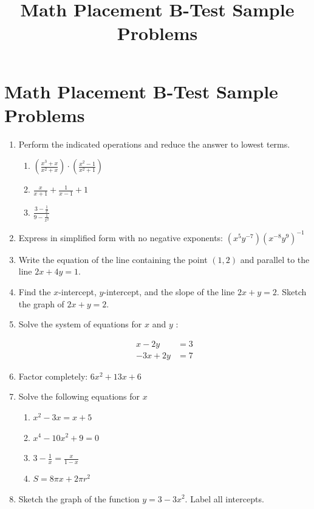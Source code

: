 \documentclass{ximera}
\title{Math Placement B-Test Sample Problems}
\begin{document}
\section*{Math Placement B-Test Sample Problems}

\begin{enumerate}
\item Perform the indicated operations and reduce the answer to lowest terms.

\begin{enumerate}
\item $\left(\frac{x^{3}+x}{x^{2}+x}\right) \cdot\left(\frac{x^{2}-1}{x^{2}+1}\right)$
\item $\frac{x}{x+1}+\frac{1}{x-1}+1$
\item $\frac{3-\frac{1}{x}}{9-\frac{1}{x^{2}}}$
\end{enumerate}

\item Express in simplified form with no negative exponents: $\left(x^{5} y^{-7}\right)\left(x^{-8} y^{9}\right)^{-1}$

\item Write the equation of the line containing the point $(1,2)$ and parallel to the line $2 x+4 y=1$.

\item Find the $x$-intercept, $y$-intercept, and the slope of the line $2 x+y=2$. Sketch the graph of $2 x+y=2$.

\item Solve the system of equations for $x$ and $y$ :

$$\begin{aligned}
x-2 y & =3 \\
-3 x+2 y & =7
\end{aligned}$$

\item Factor completely: $6 x^{2}+13 x+6$

\item Solve the following equations for $x$ 

\begin{enumerate}
\item $x^{2}-3 x=x+5$
\item $x^{4}-10 x^{2}+9=0$
\item $3-\frac{1}{x}=\frac{x}{1-x}$
\item $S=8 \pi x+2 \pi r^{2}$
\end{enumerate}

\item Sketch the graph of the function $y=3-3 x^{2}$. Label all intercepts.


\end{enumerate}
\end{document}

